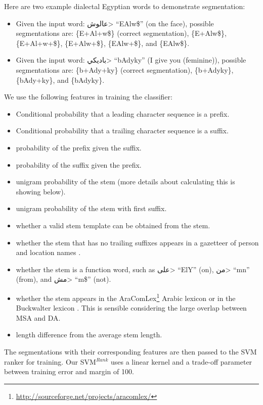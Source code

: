 \documentclass[11pt,letterpaper]{article}
\begin{document}
Here are two example dialectal Egyptian words to demonstrate segmentation:
\begin{itemize}[leftmargin=*]
\setlength\itemsep{-0.3em}
\item Given the input word: \<عالوش> ``EAlw\$'' (on the face), possible segmentations are: \{E+Al+w\$\} (correct segmentation), \{E+Alw\$\}, \{E+Al+w+\$\}, \{E+Alw+\$\}, \{EAlw+\$\}, and \{EAlw\$\}.
\item Given the input word: \<باديكي> ``bAdyky'' (I give you (feminine)), possible segmentations are: \{b+Ady+ky\} (correct segmentation), \{b+Adyky\}, \{bAdy+ky\}, and \{bAdyky\}.
\end{itemize}



We use the following features in training the classifier:
\begin{itemize}[leftmargin=*]
\setlength\itemsep{-0.3em}
\item Conditional probability that a leading character sequence is a prefix.
\item Conditional probability that a trailing character sequence is a suffix.
\item probability of the prefix given the suffix.
\item probability of the suffix given the prefix.
\item unigram probability of the stem (more details about calculating this is showing below).
\item unigram probability of the stem with first suffix.
\item whether a valid stem template can be obtained from the stem.
\item whether the stem that has no trailing suffixes appears in a gazetteer of person and location names \cite{abdelali2016farasa}.
\item whether the stem is a function word, such as \<على> ``ElY'' (on), \<من> ``mn'' (from), and \<مش> ``m\$'' (not).
\item whether the stem appears in the AraComLex\footnote{\url{http://sourceforge.net/projects/aracomlex/}} Arabic lexicon \cite{attia2011open} or in the Buckwalter lexicon \cite{buckwalter2002buckwalter}. This is sensible considering the large overlap between MSA and DA.
\item length difference from the average stem length.
\end{itemize}

The segmentations with their corresponding features are then passed to the SVM ranker \cite{joachims2006training} for training. Our SVM$^{Rank}$ uses a linear kernel and a trade-off parameter between training error and margin of 100.
\end{document}
